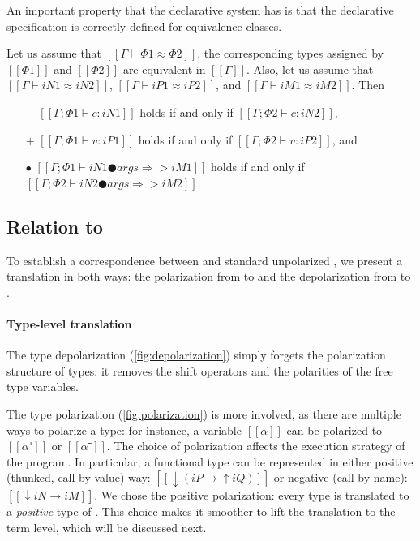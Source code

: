   An important property that the declarative system has is
  that the declarative specification is correctly defined for
  equivalence classes.

\begin{property}
  Let us assume that $[[Γ ⊢ Φ1 ≈ Φ2]]$, \ie  
  the corresponding types assigned by $[[Φ1]]$ and
  $[[Φ2]]$ are equivalent in $[[Γ]]$.
  Also, let us assume that 
  $[[Γ ⊢ iN1 ≈ iN2]]$, $[[Γ ⊢ iP1 ≈ iP2]]$,
  and $[[Γ ⊢ iM1 ≈ iM2]]$. Then
  \begin{itemize}
    \item [$-$] $[[Γ ; Φ1 ⊢ c : iN1]]$ holds if and only if $[[Γ ; Φ2 ⊢ c : iN2]]$,
    \item [$+$] $[[Γ ; Φ1 ⊢ v : iP1]]$ holds if and only if $[[Γ ; Φ2 ⊢ v : iP2]]$, and
    \item [$\bullet$] $[[Γ; Φ1 ⊢ iN1 ● args ⇒> iM1]]$ holds if and only if $[[Γ; Φ2 ⊢ iN2 ● args ⇒> iM2]]$.
  \end{itemize}
\end{property}

\subsection{Relation to \systemf}
\label{sec:rel-to-systemf}

To establish a correspondence between \fexists and standard unpolarized \systemf,
we present a translation in both ways: the polarization from \systemf to \fexists
and the depolarization from \fexists to \systemf.



\paragraph*{Type-level translation}

The type depolarization (\cref{fig:depolarization}) simply forgets the polarization structure of types:
it removes the shift operators and the polarities of the free type variables.

The type polarization (\cref{fig:polarization}) is more involved, as there are
multiple ways to polarize a type: for instance, a variable $[[α]]$ can be
polarized to $[[α⁺]]$ or $[[α⁻]]$. The choice of polarization affects the
execution strategy of the program. 
In particular, a functional type can be represented in either positive (thunked, call-by-value) way:
$[[↓(iP → ↑iQ)]]$ or negative (call-by-name): $[[↓iN → iM]]$.
We chose the positive polarization: every \systemf type is translated to a
\emph{positive} type of \fexists. This choice makes it smoother to lift the
translation to the term level, which will be discussed next.

